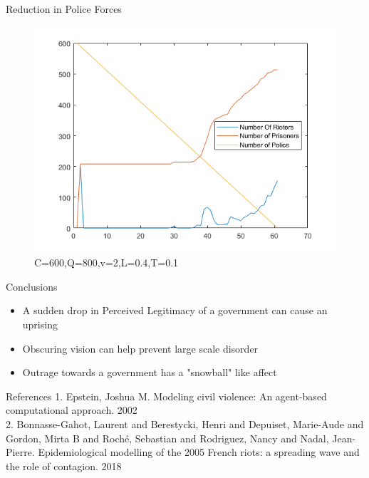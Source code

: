 \documentclass[final,hyperref={pdfpagelabels=false}]{beamer}
\begin{document}
\begin{frame}[t]
\begin{columns}[t]
\begin{column}{.32\textwidth}
\begin{block}{Reduction in Police Forces}
				\begin{figure}[H]
					\includegraphics[width=\linewidth]{Police Reductions.png}
					\caption{C=600,Q=800,v=2,L=0.4,T=0.1}
					\label{fig:frenchriot}
				\end{figure}
			\end{block}
				\begin{block}{Conclusions}
					\begin{itemize}
						\item A sudden drop in Perceived Legitimacy of a government can cause an uprising
						\item Obscuring vision can help prevent large scale disorder
						\item Outrage towards a government has a "snowball" like affect
					\end{itemize}
			\end{block}
		\begin{block}{References}
			1. Epstein, Joshua M. Modeling civil violence: An agent-based computational approach. 2002\\
		2. Bonnasse-Gahot, Laurent and Berestycki, Henri and Depuiset, Marie-Aude and Gordon, Mirta B and Roch{\'e}, Sebastian and Rodriguez, Nancy and Nadal, Jean-Pierre. Epidemiological modelling of the 2005 French riots: a spreading wave and the role of contagion. 2018
	
	\end{block}
		
		
					
				\end{column} %
				

\end{columns}
\end{frame}
\end{document}

